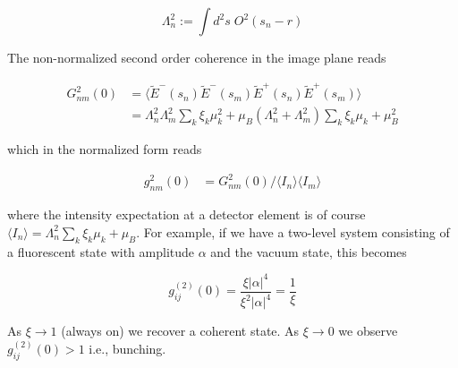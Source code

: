 \documentclass[a4paper, twocolumn, superscriptaddress,prl]{revtex4}  %
\begin{document}
\begin{equation}
\Lambda_{n}^{2} := \int d^{2}s \; O^2(s_n-r)
\end{equation}

The non-normalized second order coherence in the image plane reads 

\begin{align*}
G^{2}_{nm}(0) &= \langle \tilde{E}^{-}(s_n)\tilde{E}^{-}(s_m)\tilde{E}^{+}(s_n)\tilde{E}^{+}(s_m)  \rangle\\
&= \Lambda_{n}^{2}\Lambda_{m}^{2}\sum_{k}\xi_{k}\mu_{k}^2 + \mu_{B}(\Lambda_{n}^{2} + \Lambda_{m}^{2})\sum_{k}\xi_{k}\mu_{k} + \mu_{B}^2
\end{align*}

which in the normalized form reads

\begin{align*}
g^{2}_{nm}(0) &= G^{2}_{nm}(0) / \langle I_{n}\rangle \langle I_{m}\rangle 
\end{align*}

where the intensity expectation at a detector element is of course $\langle I_{n}\rangle = \Lambda_{n}^{2}\sum_{k}\xi_{k}\mu_{k} + \mu_{B}$. For example, if we have a two-level system consisting of a fluorescent state with amplitude $\alpha$ and the vacuum state, this becomes

\begin{equation*}
g^{(2)}_{ij}(0) = \frac{\xi\lvert\alpha\rvert^{4}}{\xi^{2}\lvert\alpha\rvert^{4}} = \frac{1}{\xi}
\end{equation*}

As $\xi\rightarrow 1$ (always on) we recover a coherent state. As $\xi\rightarrow 0$ we observe $g^{(2)}_{ij}(0) > 1$ i.e., bunching.

\clearpage
\end{document}
